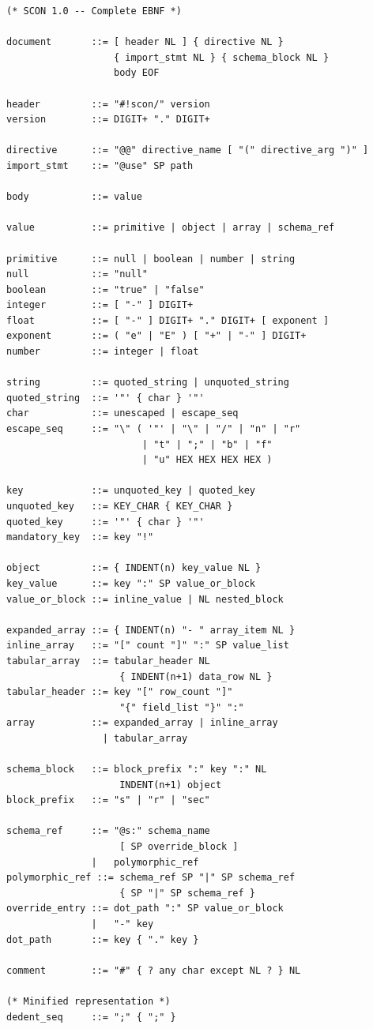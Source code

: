 \documentclass[11pt, a4paper]{article}
\begin{document}
\begin{lstlisting}[style=ebnf]
(* SCON 1.0 -- Complete EBNF *)

document       ::= [ header NL ] { directive NL }
                   { import_stmt NL } { schema_block NL }
                   body EOF

header         ::= "#!scon/" version
version        ::= DIGIT+ "." DIGIT+

directive      ::= "@@" directive_name [ "(" directive_arg ")" ]
import_stmt    ::= "@use" SP path

body           ::= value

value          ::= primitive | object | array | schema_ref

primitive      ::= null | boolean | number | string
null           ::= "null"
boolean        ::= "true" | "false"
integer        ::= [ "-" ] DIGIT+
float          ::= [ "-" ] DIGIT+ "." DIGIT+ [ exponent ]
exponent       ::= ( "e" | "E" ) [ "+" | "-" ] DIGIT+
number         ::= integer | float

string         ::= quoted_string | unquoted_string
quoted_string  ::= '"' { char } '"'
char           ::= unescaped | escape_seq
escape_seq     ::= "\" ( '"' | "\" | "/" | "n" | "r"
                        | "t" | ";" | "b" | "f"
                        | "u" HEX HEX HEX HEX )

key            ::= unquoted_key | quoted_key
unquoted_key   ::= KEY_CHAR { KEY_CHAR }
quoted_key     ::= '"' { char } '"'
mandatory_key  ::= key "!"

object         ::= { INDENT(n) key_value NL }
key_value      ::= key ":" SP value_or_block
value_or_block ::= inline_value | NL nested_block

expanded_array ::= { INDENT(n) "- " array_item NL }
inline_array   ::= "[" count "]" ":" SP value_list
tabular_array  ::= tabular_header NL
                    { INDENT(n+1) data_row NL }
tabular_header ::= key "[" row_count "]"
                    "{" field_list "}" ":"
array          ::= expanded_array | inline_array
                 | tabular_array

schema_block   ::= block_prefix ":" key ":" NL
                    INDENT(n+1) object
block_prefix   ::= "s" | "r" | "sec"

schema_ref     ::= "@s:" schema_name
                    [ SP override_block ]
               |   polymorphic_ref
polymorphic_ref ::= schema_ref SP "|" SP schema_ref
                    { SP "|" SP schema_ref }
override_entry ::= dot_path ":" SP value_or_block
               |   "-" key
dot_path       ::= key { "." key }

comment        ::= "#" { ? any char except NL ? } NL

(* Minified representation *)
dedent_seq     ::= ";" { ";" }
\end{lstlisting}
\end{document}
